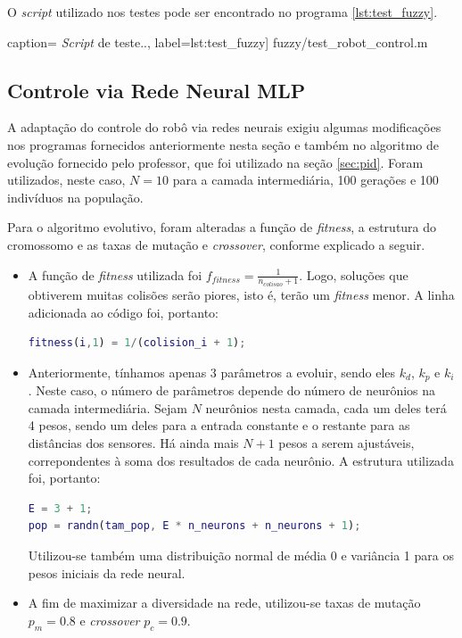 	\FloatBarrier
		
	O \textit{script} utilizado nos testes pode ser encontrado no programa
	\ref{lst:test_fuzzy}.
	
	 caption={  
	\textit{Script} de teste..}, label={lst:test_fuzzy}]
	{fuzzy/test_robot_control.m}

	\subsection {Controle via Rede Neural MLP}
	
	A adaptação do controle do robô via redes neurais exigiu algumas modificações
	nos programas fornecidos anteriormente nesta seção e também no algoritmo de
	evolução fornecido pelo professor, que foi utilizado na seção \ref{sec:pid}.
	Foram utilizados, neste caso, \(N = 10\) para a camada intermediária, 100
	gerações e 100 indivíduos na população.
	
	\vspace{12pt}
	
	Para o algoritmo evolutivo, foram alteradas a função de \textit{fitness}, a
	estrutura do cromossomo e as taxas de mutação e \textit{crossover}, conforme
	explicado a seguir.
	
	\begin{itemize}
	  \item A função de \textit{fitness} utilizada foi
	  \(f_{fitness}=\frac{1}{n_{colisao} + 1}\). Logo, soluções que obtiverem
	  muitas colisões serão piores, isto é, terão um \textit{fitness} menor. A
	  linha adicionada ao código foi, portanto:
	  
\begin{lstlisting}[language=Matlab, style=nonumbers]
fitness(i,1) = 1/(colision_i + 1);
\end{lstlisting}
	
	  \item  Anteriormente, tínhamos apenas 3 parâmetros a evoluir, sendo eles
	  \(k_d\), \(k_p\) e \(k_i\). Neste caso, o número de parâmetros depende do
	  número de neurônios na camada intermediária. Sejam \(N\) neurônios nesta
	  camada, cada um deles terá 4 pesos, sendo um deles para a entrada constante e
	  o restante para as distâncias dos sensores. Há ainda mais \(N + 1\) pesos a
	  serem ajustáveis, correpondentes à soma dos resultados de cada neurônio. A
	  estrutura utilizada foi, portanto:
	  
\begin{lstlisting}[language=Matlab, style=nonumbers]
% Numero de entradas: d1, d2, d3 e termo constante
E = 3 + 1;
pop = randn(tam_pop, E * n_neurons + n_neurons + 1);
\end{lstlisting}	  
	
	  Utilizou-se também uma distribuição normal de média 0 e variância 1 para os
	  pesos iniciais da rede neural.
	  
	  \item A fim de maximizar a diversidade na rede, utilizou-se taxas de mutação
	  \(p_m = 0.8\) e \textit{crossover} \(p_c = 0.9\).

	\end{itemize}
	
